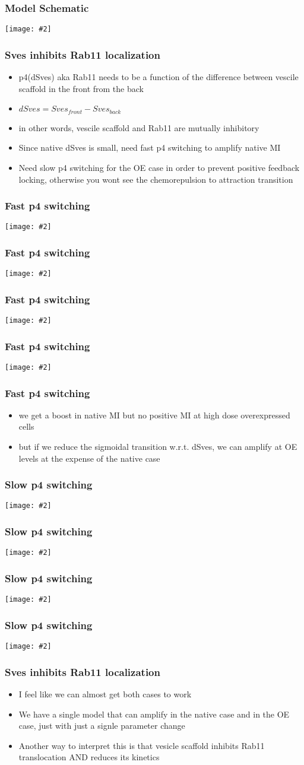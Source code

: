 \documentclass{beamer}
\newcommand{\plotslide}[2]{
  \begin{frame}
    \frametitle{#1}
    \centering
    \texttt{[image: \#2]}
  \end{frame}
}
\begin{document}
\plotslide{Model Schematic}{../tikz/flow.pdf}


\begin{frame}
  \frametitle{Sves inhibits Rab11 localization}
  \begin{itemize}
    \item p4(dSves) aka Rab11 needs to be a function of the difference between
      vescile scaffold in the front from the back
    \item $dSves = Sves_{front} - Sves_{back}$
    \item in other words, vescile scaffold and Rab11 are mutually inhibitory
    \item Since native dSves is small, need fast p4 switching to amplify
      native MI
    \item Need slow p4 switching for the OE case in order to prevent positive
      feedback locking, otherwise you wont see the chemorepulsion to attraction
      transition
  \end{itemize}
\end{frame}

\plotslide{Fast p4 switching}{n_coupled_p4_func.pdf}
\plotslide{Fast p4 switching}{n_Sves_coupled_p4.pdf}
\plotslide{Fast p4 switching}{n_dSves_coupled_p4.pdf}
\plotslide{Fast p4 switching}{n_MI_coupled_p4.pdf}
\begin{frame}
  \frametitle{Fast p4 switching}
  \begin{itemize}
    \item we get a boost in native MI but no positive MI at high dose
      overexpressed cells
    \item but if we reduce the sigmoidal transition w.r.t. dSves, we can
      amplify at OE levels at the expense of the native case
  \end{itemize}
\end{frame}
\plotslide{Slow p4 switching}{oe_coupled_p4_func.pdf}
\plotslide{Slow p4 switching}{oe_Sves_coupled_p4.pdf}
\plotslide{Slow p4 switching}{oe_dSves_coupled_p4.pdf}
\plotslide{Slow p4 switching}{oe_MI_coupled_p4.pdf}

\begin{frame}
  \frametitle{Sves inhibits Rab11 localization}
  \begin{itemize}
    \item I feel like we can almost get both cases to work
    \item We have a single model that can amplify in the native case and in
      the OE case, just with just a signle parameter change
    \item Another way to interpret this is that vesicle scaffold inhibits
      Rab11 translocation AND reduces its kinetics 
  \end{itemize}
\end{frame}
\end{document}
